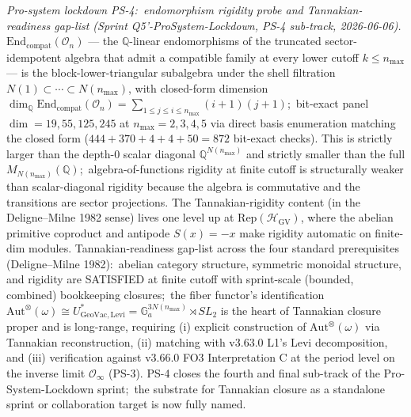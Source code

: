 \documentclass[11pt,a4paper]{article}
\theoremstyle{plain}
\theoremstyle{definition}
\begin{document}
\emph{Pro-system lockdown PS-4:\ endomorphism rigidity probe and
Tannakian-readiness gap-list (Sprint Q5'-ProSystem-Lockdown, PS-4
sub-track, 2026-06-06).}
$\mathrm{End}_{\mathrm{compat}}(\mathcal{O}_n)$ --- the
$\mathbb{Q}$-linear endomorphisms of the truncated sector-idempotent
algebra that admit a compatible family at every lower cutoff
$k \le n_{\max}$ --- is the block-lower-triangular subalgebra under
the shell filtration
$N(1) \subset \cdots \subset N(n_{\max})$, with closed-form dimension
$\dim_{\mathbb{Q}} \mathrm{End}_{\mathrm{compat}}(\mathcal{O}_n) =
\sum_{1 \le j \le i \le n_{\max}} (i+1)(j+1)$;\ bit-exact panel
$\dim = 19, 55, 125, 245$ at $n_{\max} = 2, 3, 4, 5$ via direct
basis enumeration matching the closed form
($444 + 370 + 4 + 4 + 50 = 872$ bit-exact checks).  This is
strictly larger than the depth-0 scalar diagonal
$\mathbb{Q}^{N(n_{\max})}$ and strictly smaller than the full
$M_{N(n_{\max})}(\mathbb{Q})$;\ algebra-of-functions rigidity at
finite cutoff is structurally weaker than scalar-diagonal rigidity
because the algebra is commutative and the transitions are sector
projections.  The Tannakian-rigidity content (in the Deligne--Milne
1982 sense) lives one level up at
$\mathrm{Rep}(\mathcal{H}_{\mathrm{GV}})$, where the abelian
primitive coproduct and antipode $S(x) = -x$ make rigidity
automatic on finite-dim modules.  Tannakian-readiness gap-list
across the four standard prerequisites (Deligne--Milne 1982):\
abelian category structure, symmetric monoidal structure, and
rigidity are SATISFIED at finite cutoff with sprint-scale
(bounded, combined) bookkeeping closures;\ the fiber
functor's identification
$\mathrm{Aut}^\otimes(\omega) \cong U^*_{\mathrm{GeoVac},
\mathrm{Levi}} = \mathbb{G}_a^{3 N(n_{\max})} \rtimes SL_2$ is the
heart of Tannakian closure proper and is long-range, requiring
(i) explicit construction of $\mathrm{Aut}^\otimes(\omega)$ via
Tannakian reconstruction, (ii) matching with v3.63.0 L1's Levi
decomposition, and (iii) verification against v3.66.0 FO3
Interpretation C at the period level on the inverse limit
$\mathcal{O}_\infty$ (PS-3). PS-4 closes the fourth and final
sub-track of the Pro-System-Lockdown sprint;\ the substrate for
Tannakian closure as a standalone sprint or collaboration target
is now fully named.
\end{document}
